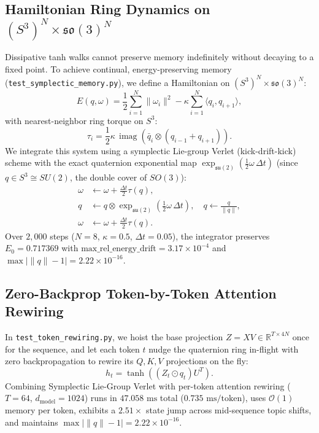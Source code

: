 \documentclass[11pt,twocolumn]{article}
\begin{document}
\subsection{Hamiltonian Ring Dynamics on $(S^3)^N \times \mathfrak{so}(3)^N$}
Dissipative tanh walks cannot preserve memory indefinitely without decaying to a fixed point. To achieve continual, energy-preserving memory (\texttt{test\_symplectic\_memory.py}), we define a Hamiltonian on $(S^3)^N \times \mathfrak{so}(3)^N$:
\begin{equation}
E(q, \omega) = \frac{1}{2}\sum_{i=1}^N \|\omega_i\|^2 - \kappa \sum_{i=1}^N \langle q_i, q_{i+1} \rangle,
\end{equation}
with nearest-neighbor ring torque on $S^3$:
\begin{equation}
\tau_i = \frac{1}{2}\kappa\,\operatorname{imag}\!\left(\bar{q}_i \otimes (q_{i-1} + q_{i+1})\right).
\end{equation}
We integrate this system using a symplectic Lie-group Verlet (kick-drift-kick) scheme with the exact quaternion exponential map $\exp_{\mathfrak{su}(2)}(\frac{1}{2}\omega\,\Delta t)$ (since $q \in S^3 \cong SU(2)$, the double cover of $SO(3)$):
\begin{align}
\omega &\leftarrow \omega + \frac{\Delta t}{2} \tau(q), \\
q &\leftarrow q \otimes \exp_{\mathfrak{su}(2)}\!\left(\frac{1}{2}\omega\,\Delta t\right), \quad q \leftarrow \frac{q}{\|q\|}, \\
\omega &\leftarrow \omega + \frac{\Delta t}{2} \tau(q).
\end{align}
Over $2{,}000$ steps ($N=8$, $\kappa=0.5$, $\Delta t=0.05$), the integrator preserves $E_0 = 0.717369$ with $\text{max\_rel\_energy\_drift} = 3.17 \times 10^{-4}$ and $\max |\|q\| - 1| = 2.22 \times 10^{-16}$.

\subsection{Zero-Backprop Token-by-Token Attention Rewiring}
In \texttt{test\_token\_rewiring.py}, we hoist the base projection $Z = X V \in \mathbb{R}^{T \times 4N}$ once for the sequence, and let each token $t$ nudge the quaternion ring in-flight with zero backpropagation to rewire its $Q, K, V$ projections on the fly:
\begin{equation}
h_t = \tanh\!\left((Z_t \odot q_t) U^T\right).
\end{equation}
Combining Symplectic Lie-Group Verlet with per-token attention rewiring ($T=64$, $d_{\text{model}}=1024$) runs in $47.058\text{ ms}$ total ($0.735\text{ ms/token}$), uses $\mathcal{O}(1)$ memory per token, exhibits a $2.51\times$ state jump across mid-sequence topic shifts, and maintains $\max |\|q\| - 1| = 2.22 \times 10^{-16}$.
\end{document}
